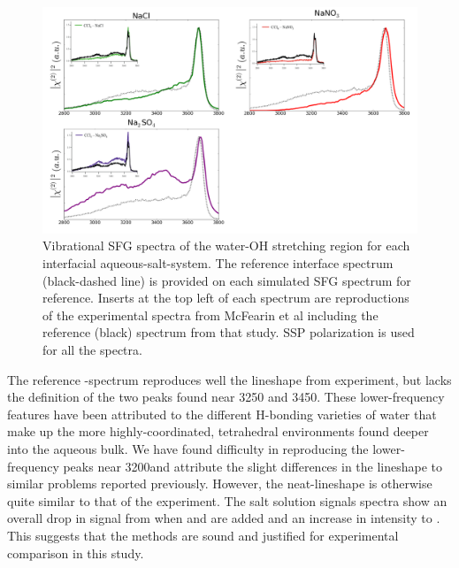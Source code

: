 \begin{figure}[h!]
\begin{center}
	\includegraphics[scale=1.0]{images/sfg-spectra.png}
	\caption{Vibrational SFG spectra of the water-OH stretching region for each interfacial aqueous-salt-\ctc system. The reference \ctcwat interface spectrum (black-dashed line) is provided on each simulated SFG spectrum for reference. Inserts at the top left of each spectrum are reproductions of the experimental spectra from McFearin et al\cite{McFearin2009} including the reference (black) spectrum from that study. SSP polarization is used for all the spectra.}
	\label{fig:sfg-spectra}
\end{center}
\end{figure}

The reference \ctc-\wat spectrum reproduces well the lineshape from experiment, but lacks the definition of the two peaks found near 3250 and 3450\cm. These lower-frequency features have been attributed to the different H-bonding varieties of water that make up the more highly-coordinated, tetrahedral environments found deeper into the aqueous bulk. We have found difficulty in reproducing the lower-frequency peaks near 3200\cm and attribute the slight differences in the lineshape to similar problems reported previously.\cite{Walker2006b} However, the neat-\ctcwat lineshape is otherwise quite similar to that of the experiment. The salt solution signals spectra show an overall drop in signal from when \cl and \nit are added and an increase in intensity to \sul. This suggests that the methods are sound and justified for experimental comparison in this study.

